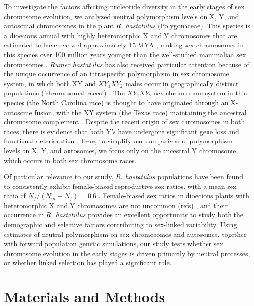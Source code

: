 \documentclass[9pt,twocolumn,twoside]{gsajnl}
\begin{document}
To investigate the factors affecting nucleotide diversity in the early stages of sex chromosome evolution, we analyzed neutral polymorphism levels on X, Y, and autosomal chromosomes in the plant \textit{R. hastatulus }(Polygonaceae). This species is a dioecious annual with highly heteromorphic X and Y chromosomes that are estimated to have evolved  approximately 15 MYA \citep{quesada2011,grabowska2015,navajas2005}, making sex chromosomes in this species over 100 million years younger than the well-studied mammalian sex chromosomes \citep{lahn1999,ross2005dna}. \textit{Rumex hastatulus} has also received particular attention because of the unique occurrence of an intraspecific polymorphism in sex chromosome system, in which both XY and $XY_{1}XY_{2}$ males occur in geographically distinct populations ('chromosomal races') \citep{smith1963mechanism}. The $XY_{1}XY_{2}$ sex chromosome system in this species (the North Carolina race) is thought to have originated through an X-autosome fusion, with the XY system (the Texas race) maintaining the ancestral chromosome complement \citep{smith1964evolving}. Despite the recent origin of sex chromosomes in both races, there is evidence that both Y's have undergone significant gene loss and functional deterioration \citep{hough2014}. Here, to simplify our comparison of polymorphism levels on X, Y, and autosomes, we focus only on the ancestral Y chromosome, which occurs in both sex chromosome races.

Of particular relevance to our study, \textit{R. hastatulus} populations have been found to consistently exhibit female-biased reproductive sex ratios, with a mean sex ratio of $N_{f}/(N_{m}+N_{f})=0.6$ \citep{pickup2013influence}. Female-biased sex ratios in dioecious plants with heteromorphic X and Y chromosomes are not uncommon (\X refs) \citep{hough2013evolutionarily}, and their occurrence in \textit{R. hastatulus} provides an excellent opportunity to study both the demographic and selective factors contributing to sex-linked variability. Using estimates of neutral polymorphism on sex chromosomes and autosomes, together with forward population genetic simulations, our study tests whether sex chromosome evolution in the early stages is driven primarily by neutral processes, or whether linked selection has played a significant role.

\section*{Materials and Methods}
\end{document}
